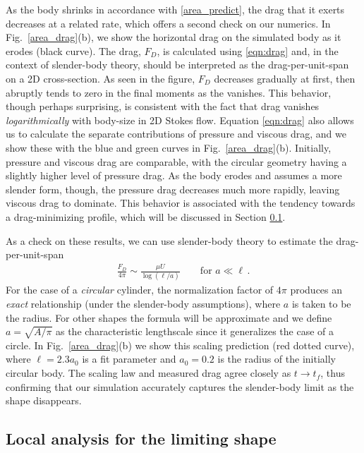 \documentclass[preprint, 10pt]{elsarticle}
\begin{document}
	As the body shrinks in accordance with \eqref{area_predict}, the drag that it exerts decreases at a related rate, which offers a second check on our numerics. In Fig.~\ref{area_drag}(b), we show the horizontal drag on the simulated body as it erodes (black curve). The drag, $F_D$, is calculated using \eqref{eqn:drag} and, in the context of slender-body theory, should be interpreted as the drag-per-unit-span on a 2D cross-section. As seen in the figure, $F_D$ decreases gradually at first, then abruptly tends to zero in the final moments as the vanishes. This behavior, though perhaps surprising, is consistent with the fact that drag vanishes {\em logarithmically} with body-size in 2D Stokes flow. Equation \eqref{eqn:drag} also allows us to calculate the separate contributions of pressure and viscous drag, and we show these with the blue and green curves in Fig.~\ref{area_drag}(b). Initially, pressure and viscous drag are comparable, with the circular geometry having a slightly higher level of pressure drag. As the body erodes and assumes a more slender form, though, the pressure drag decreases much more rapidly, leaving viscous drag to dominate. This behavior is associated with the tendency towards a drag-minimizing profile, which will be discussed in Section \ref{LimitingShape}.

As a check on these results, we can use slender-body theory to estimate the drag-per-unit-span
\begin{align}
\label{dragscaling}
\frac{F_D}{4 \pi} \sim \frac{ \mu U}{\log(\ell/a)}	\qquad \text{for } a \ll \ell \, .
\end{align}
For the case of a {\em circular} cylinder, the normalization factor of $4 \pi$ produces an {\em exact} relationship (under the slender-body assumptions), where $a$ is taken to be the radius. For other shapes the formula will be approximate and we define $a = \sqrt{A/\pi}$ as the characteristic lengthscale since it generalizes the case of a circle. In Fig.~\ref{area_drag}(b) we show this scaling prediction (red dotted curve), where $\ell = 2.3 a_0$ is a fit parameter and $a_0 = 0.2$ is the radius of the initially circular body. The scaling law and measured drag agree closely as $t \to t_f$, thus confirming that our simulation accurately captures the slender-body limit as the shape disappears.


\subsection{Local analysis for the limiting shape}
\label{LimitingShape}
 
\end{document}
